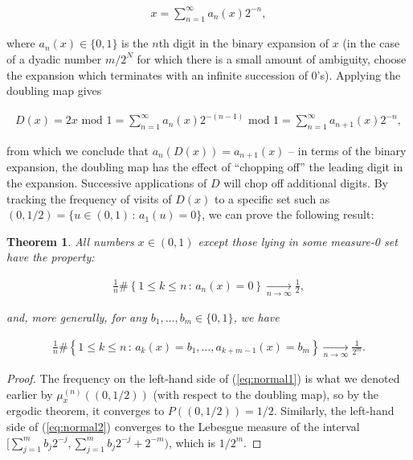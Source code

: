 \documentclass[11pt]{report}
\theoremstyle{plain}
\newtheorem{thm}{Theorem}[chapter]
\theoremstyle{definition}
\begin{document}
\begin{align*}
x = \sum_{n=1}^\infty a_n(x) 2^{-n},
\end{align*}

where $a_n(x) \in \{0,1\}$ is the $n$th digit in the
binary expansion of $x$ (in the case of a dyadic
number $m/2^N$ for which there is a small amount of
ambiguity, choose the expansion which terminates with
an infinite succession of $0$'s). Applying the
doubling map gives

\begin{align*}
D(x) = 2x\textrm{ mod 1} = \sum_{n=1}^\infty a_n(x) 2^{-(n-1)} \textrm{ mod }1 = \sum_{n=1}^\infty a_{n+1}(x)2^{-n},
\end{align*}

from which we conclude that $a_n(D(x)) = a_{n+1}(x)$
-- in terms of the binary expansion, the doubling map
has the effect of ``chopping off'' the leading digit
in the expansion. Successive applications of $D$ will
chop off additional digits. By tracking the frequency
of visits of $D(x)$ to a specific set such as
$(0,1/2) = \{ u\in(0,1)\,:\, a_1(u)=0 \}$, we can
prove the following result:

\begin{thm}
All numbers $x\in(0,1)$ except those lying in some
measure-0 set have the property:

\begin{equation*} \tag{35}\label{eq:normal1}
\begin{split}
\frac{1}{n}\#\left\{ 1\le k\le n\,:\, a_n(x) = 0 \right\} \xrightarrow[n\to\infty]{} \tfrac12,
\end{split}
\end{equation*}

and, more generally, for any
$b_1,\ldots,b_m\in\{0,1\}$, we have

\begin{equation*} \tag{36}\label{eq:normal2}
\begin{split}
\frac{1}{n}\#\left\{ 1\le k\le n\,:\, a_k(x) = b_1,\ldots, a_{k+m-1}(x)=b_m \right\} \xrightarrow[n\to\infty]{} \frac{1}{2^m}.
\end{split}
\end{equation*}

\end{thm}

\begin{proof}
The frequency on the left-hand side of (\ref{eq:normal1})
is what we denoted earlier by $\mu_x^{(n)}((0,1/2))$
(with respect to the doubling map), so by the ergodic
theorem, it converges to $P((0,1/2))=1/2$. Similarly,
the left-hand side of (\ref{eq:normal2}) converges to the
Lebesgue measure of the interval
$[\sum_{j=1}^m b_j 2^{-j},\sum_{j=1}^m b_j
2^{-j}+2^{-m})$,
which is $1/2^m$.
\end{proof}
\end{document}
